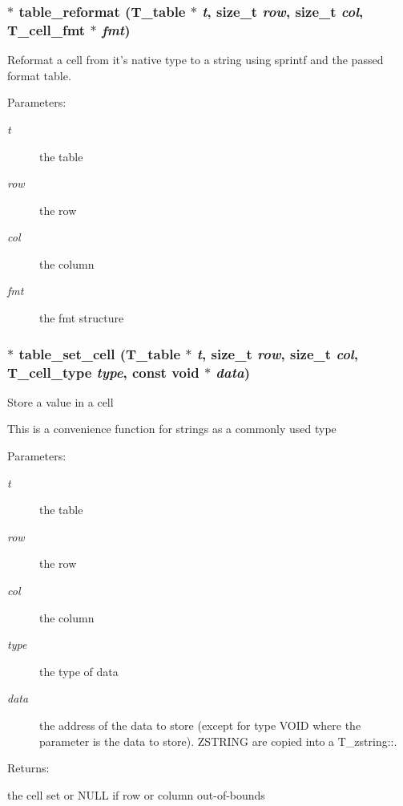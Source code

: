\subsubsection{$\ast$ table\_\-reformat ({\bf T\_\-table} $\ast$ {\em t}, size\_\-t {\em row}, size\_\-t {\em col}, {\bf T\_\-cell\_\-fmt} $\ast$ {\em fmt})}\label{table_8h_a35}


Reformat a cell from it's native type to a string using sprintf and the passed format table. \begin{Desc}
\item[Parameters: ]\par
\begin{description}
\item[{\em 
t}]the table \item[{\em 
row}]the row \item[{\em 
col}]the column \item[{\em 
fmt}]the fmt structure \end{description}
\end{Desc}
\subsubsection{$\ast$ table\_\-set\_\-cell ({\bf T\_\-table} $\ast$ {\em t}, size\_\-t {\em row}, size\_\-t {\em col}, {\bf T\_\-cell\_\-type} {\em type}, const void $\ast$ {\em data})}\label{table_8h_a30}


Store a value in a cell

This is a convenience function for strings as a commonly used type\begin{Desc}
\item[Parameters: ]\par
\begin{description}
\item[{\em 
t}]the table \item[{\em 
row}]the row \item[{\em 
col}]the column \item[{\em 
type}]the type of data \item[{\em 
data}]the address of the data to store (except for type VOID where the parameter is the data to store). ZSTRING are copied into a T\_\-zstring::.\end{description}
\end{Desc}
\begin{Desc}
\item[Returns: ]\par
the cell set or NULL if row or column out-of-bounds \end{Desc}
